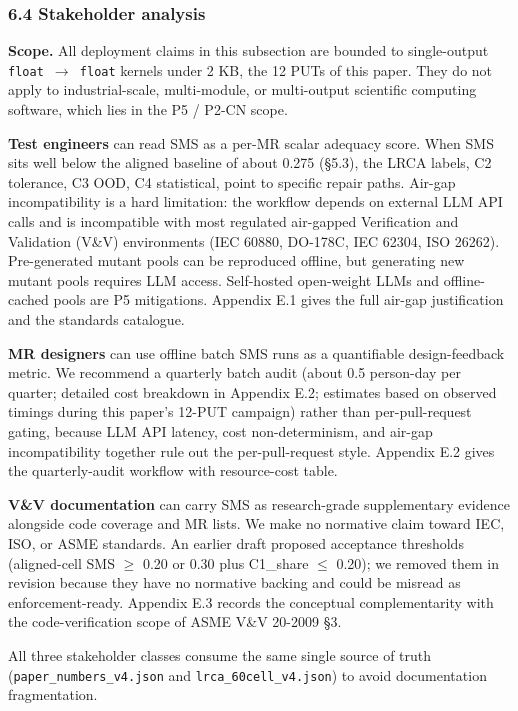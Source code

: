 \documentclass[review,12pt,authoryear]{elsarticle}
\begin{document}
\subsubsection{6.4 Stakeholder analysis}\label{stakeholder-analysis-single-output-kernels-scope}

\textbf{Scope.} All deployment claims in this subsection are bounded to
single-output \texttt{float\ $\to$\ float} kernels under 2 KB, the 12 PUTs
of this paper. They do not apply to industrial-scale, multi-module, or
multi-output scientific computing software, which lies in the P5 / P2-CN
scope.

\textbf{Test engineers} can read SMS as a per-MR scalar adequacy score.
When SMS sits well below the aligned baseline of about 0.275 (§5.3), the
LRCA labels, C2 tolerance, C3 OOD, C4 statistical, point to specific
repair paths. Air-gap incompatibility is a hard limitation: the workflow
depends on external LLM API calls and is incompatible with most
regulated air-gapped Verification and Validation (V\&V) environments
(IEC 60880, DO-178C, IEC 62304, ISO 26262). Pre-generated mutant pools
can be reproduced offline, but generating new mutant pools requires LLM
access. Self-hosted open-weight LLMs and offline-cached pools are P5
mitigations. Appendix E.1 gives the full air-gap justification and the
standards catalogue.

\textbf{MR designers} can use offline batch SMS runs as a quantifiable
design-feedback metric. We recommend a quarterly batch audit (about 0.5
person-day per quarter; detailed cost breakdown in Appendix E.2;
estimates based on observed timings during this paper's 12-PUT campaign)
rather than per-pull-request gating, because LLM API latency, cost
non-determinism, and air-gap incompatibility together rule out the
per-pull-request style. Appendix E.2 gives the quarterly-audit workflow
with resource-cost table.

\textbf{V\&V documentation} can carry SMS as research-grade
supplementary evidence alongside code coverage and MR lists. We make no
normative claim toward IEC, ISO, or ASME standards. An earlier draft
proposed acceptance thresholds (aligned-cell SMS $\geq$ 0.20 or 0.30 plus
C1\_share $\leq$ 0.20); we removed them in revision because they have no
normative backing and could be misread as enforcement-ready. Appendix
E.3 records the conceptual complementarity with the code-verification
scope of ASME V\&V 20-2009 §3.

All three stakeholder classes consume the same single source of truth
(\texttt{paper\_numbers\_v4.json} and \texttt{lrca\_60cell\_v4.json}) to
avoid documentation fragmentation.
\end{document}

